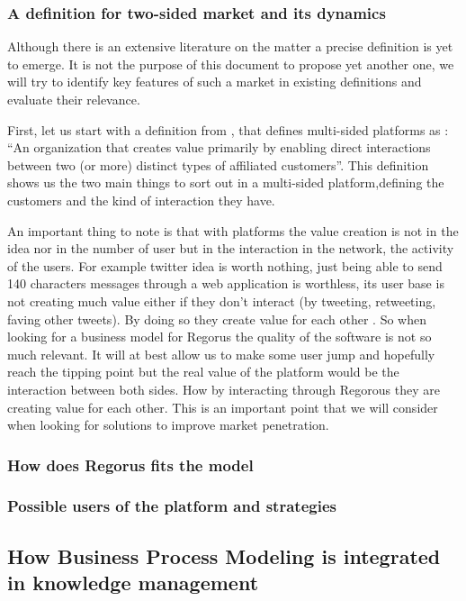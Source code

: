 \documentclass[10pt]{report}
\begin{document}
\subsubsection{A definition for two-sided market and its dynamics}

Although there is an extensive literature on the matter a precise definition is yet to emerge. It is not the purpose of this document to propose yet another one, we will try to identify key features of such a market in existing definitions and evaluate their relevance.

First, let us start with a definition from \autocite{Hagiu2011}, that defines multi-sided platforms as : \enquote{An organization that creates value primarily by enabling direct interactions between two (or more) distinct types of affiliated customers}. This definition shows us the two main things to sort out in a multi-sided platform,defining the customers and the kind of interaction they have. 




An important thing to note is that with platforms the value creation is not in the idea nor in the number of user but in the interaction in the network, the activity of the users. For example twitter idea is worth nothing, just being able to send 140 characters messages through a web application is worthless, its user base is not creating much value either if they don't interact (by tweeting, retweeting, faving other tweets). By doing so they create value for each other \autocite{Choudary2014}. So when looking for a business model for Regorus the quality of the software is not so much relevant. It will at best allow us to make some user jump and hopefully reach the tipping point but the real value of the platform would be the interaction between both sides. How by interacting through Regorous they are creating value for each other. This is an important point that we will consider when looking for solutions to improve market penetration.


\subsubsection{How does Regorus fits the model}
\subsubsection{Possible users of the platform and strategies}

\subsection{How Business Process Modeling is integrated in knowledge management}
\end{document}
